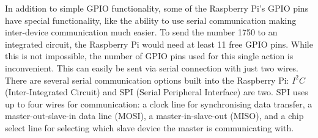 \documentclass[twoside,a4]{report}
\def\br{\newline \newline \noindent}
\begin{document}
	\noindent
	In addition to simple GPIO functionality, some of the Raspberry Pi's GPIO pins have special functionality, like the ability to use serial communication making inter-device communication much easier. To send the number 1750 to an integrated circuit, the Raspberry Pi would need at least 11 free GPIO pins. While this is not impossible, the number of GPIO pins used for this single action is inconvenient. This can easily be sent via serial connection with just two wires. There are several serial communication options built into the Raspberry Pi: $I^2C$ (Inter-Integrated Circuit) and SPI (Serial Peripheral Interface) are two. SPI uses up to four wires for communication: a clock line for synchronising data transfer, a master-out-slave-in data line (MOSI), a master-in-slave-out (MISO), %
	and a chip select line for selecting which slave device the master is communicating with.
\end{document}
